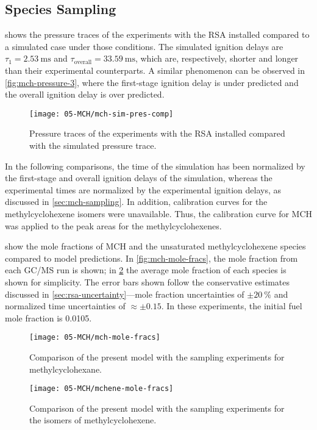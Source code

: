 \documentclass[../main.tex]{subfiles}
\begin{document}
\subsection{Species Sampling}

 shows the pressure traces of the experiments
with the RSA installed compared to a simulated case under those conditions.
The simulated ignition delays are $\tau_1=\SI{2.53}{\milli\second}$ and
$\tau_{\text{overall}}=\SI{33.59}{\milli\second}$, which are, respectively,
shorter and longer than their experimental counterparts. A similar
phenomenon can be observed in \cref{fig:mch-pressure-3}, where the first-stage
ignition delay is under predicted and the overall ignition delay is over
predicted.

\begin{figure}
\texttt{[image: 05-MCH/mch-sim-pres-comp]}
\caption{Pressure traces of the experiments with the RSA installed compared
with the simulated pressure trace.}
\label{fig:mch-sim-pres-comp}
\end{figure}

In the following comparisons, the time of the simulation has been
normalized by the first-stage and overall ignition delays of the simulation,
whereas the experimental times are normalized by the experimental ignition
delays, as discussed in \cref{sec:mch-sampling}.
In addition, calibration curves for the methylcyclohexene isomers were
unavailable. Thus, the calibration curve for MCH was applied to the peak
areas for the methylcyclohexenes.

 show the mole fractions
of MCH and the unsaturated methylcyclohexene species compared to model
predictions. In \cref{fig:mch-mole-fracs}, the mole fraction from each
GC/MS run is shown; in \cref{fig:mchene-mole-fracs} the average mole
fraction of each species is shown for simplicity. The error bars shown
follow the conservative estimates discussed in \cref{sec:rsa-uncertainty}---mole fraction uncertainties of
$\pm\SI{20}{\percent}$ and normalized time uncertainties of $\approx\pm\num{0.15}$.
In these experiments, the initial fuel mole fraction is \num{0.0105}.

\begin{figure}
    \begin{floatrow}
        \ffigbox
            {\texttt{[image: 05-MCH/mch-mole-fracs]}}
            {\caption{Comparison of the present model with the sampling
            experiments for methylcyclohexane.}
            \label{fig:mch-mole-fracs}}
        \ffigbox
            {\texttt{[image: 05-MCH/mchene-mole-fracs]}}
            {\caption{Comparison of the present model with the sampling
            experiments for the isomers of methylcyclohexene.}
            \label{fig:mchene-mole-fracs}}
    \end{floatrow}
\end{figure}
\end{document}
